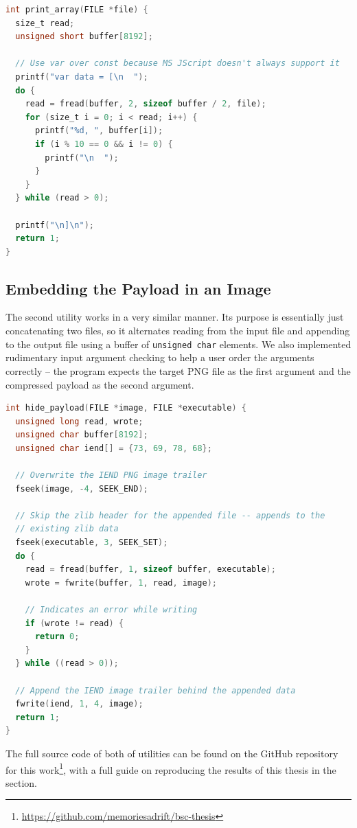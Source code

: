 \begin{lstlisting}[language=C, caption={Payload serialisation function}]
int print_array(FILE *file) {
  size_t read;
  unsigned short buffer[8192];

  // Use var over const because MS JScript doesn't always support it
  printf("var data = [\n  ");
  do {
    read = fread(buffer, 2, sizeof buffer / 2, file);
    for (size_t i = 0; i < read; i++) {
      printf("%d, ", buffer[i]);
      if (i % 10 == 0 && i != 0) {
        printf("\n  ");
      }
    }
  } while (read > 0);

  printf("\n]\n");
  return 1;
}
\end{lstlisting}

\subsection{Embedding the Payload in an Image}
The second utility works in a very similar manner. Its purpose is essentially just concatenating two files, so it
alternates reading from the input file and appending to the output file using a buffer of \verb+unsigned char+ elements. 
We also implemented rudimentary input argument checking to help a user order the arguments correctly -- the program 
expects the target \acrshort{PNG} file as the first argument and the compressed payload as the second argument.

\begin{lstlisting}[language=C, caption={Payload concealment function to attach the compressed \acrshort{HTA} to the
\acrshort{PNG}.}]
int hide_payload(FILE *image, FILE *executable) {
  unsigned long read, wrote;
  unsigned char buffer[8192];
  unsigned char iend[] = {73, 69, 78, 68};

  // Overwrite the IEND PNG image trailer
  fseek(image, -4, SEEK_END); 

  // Skip the zlib header for the appended file -- appends to the
  // existing zlib data
  fseek(executable, 3, SEEK_SET);
  do {
    read = fread(buffer, 1, sizeof buffer, executable);
    wrote = fwrite(buffer, 1, read, image);

    // Indicates an error while writing
    if (wrote != read) {
      return 0;
    }
  } while ((read > 0));

  // Append the IEND image trailer behind the appended data
  fwrite(iend, 1, 4, image); 
  return 1;
}
\end{lstlisting}

The full source code of both of utilities can be found on the GitHub repository for this 
work\footnote{\url{https://github.com/memoriesadrift/bsc-thesis}}, with a full guide on reproducing the results of this 
thesis in the  section.

